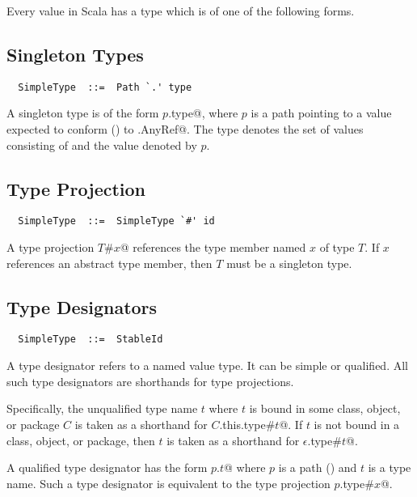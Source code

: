 Every value in Scala has a type which is of one of the following
forms.

\subsection{Singleton Types}
\label{sec:singleton-type}

\syntax\begin{lstlisting}
  SimpleType  ::=  Path `.' type
\end{lstlisting}

A singleton type is of the form \lstinline@$p$.type@, where $p$ is a
path pointing to a value expected to conform ()
to \lstinline@scala.AnyRef@.  The type denotes the set of values
consisting of  and the value denoted by $p$. 

\subsection{Type Projection}
\label{sec:type-project}

\syntax\begin{lstlisting} 
  SimpleType  ::=  SimpleType `#' id
\end{lstlisting}

A type projection \lstinline@$T$#$x$@ references the type member named
$x$ of type $T$. If $x$ references an abstract type member, then $T$
must be a singleton type. 

\subsection{Type Designators}
\label{sec:type-desig}

\syntax\begin{lstlisting}
  SimpleType  ::=  StableId
\end{lstlisting}

A type designator refers to a named value type. It can be simple or
qualified. All such type designators are shorthands for type projections.

Specifically, the unqualified type name $t$ where $t$ is bound in some
class, object, or package $C$ is taken as a shorthand for
\lstinline@$C$.this.type#$t$@.  If $t$ is not bound in a class, object, or
package, then $t$ is taken as a shorthand for
\lstinline@$\epsilon$.type#$t$@.

A qualified type designator has the form \lstinline@$p$.$t$@ where $p$ is
a path () and $t$ is a type name. Such a type designator is
equivalent to the type projection \lstinline@$p$.type#$x$@.

